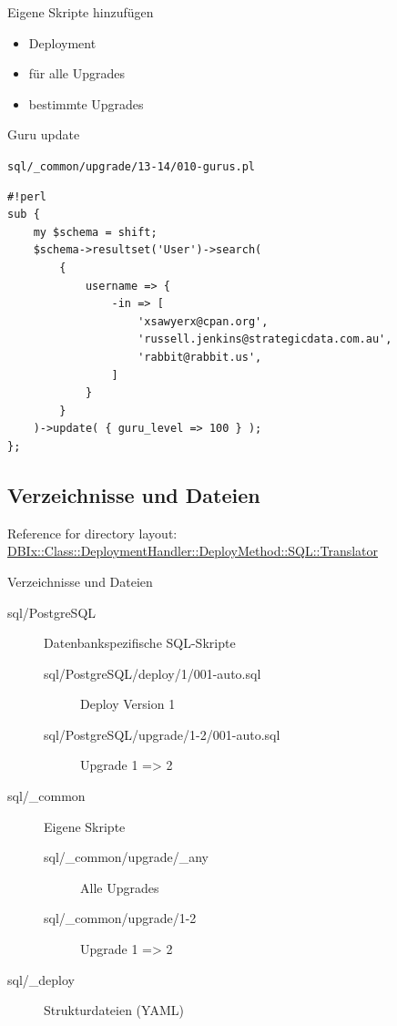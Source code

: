 \begin{frame}{Eigene Skripte hinzufügen}
\begin{itemize}
\item Deployment
\item für alle Upgrades
\item bestimmte Upgrades
\end{itemize}
\end{frame}

\begin{frame}[fragile]{Guru update}

\verb|sql/_common/upgrade/13-14/010-gurus.pl|

\begin{lstlisting}
#!perl
sub {
    my $schema = shift;
    $schema->resultset('User')->search(
        {
            username => {
                -in => [
                    'xsawyerx@cpan.org',
                    'russell.jenkins@strategicdata.com.au',
                    'rabbit@rabbit.us',
                ]
            }
        }
    )->update( { guru_level => 100 } );
};

\end{lstlisting}
\end{frame}

\subsection{Verzeichnisse und Dateien}

Reference for directory layout:
\href{https://metacpan.org/pod/DBIx::Class::DeploymentHandler::DeployMethod::SQL::Translator}{DBIx::Class::DeploymentHandler::DeployMethod::SQL::Translator}

\begin{frame}[fragile]{Verzeichnisse und Dateien}
\begin{description}
\item[sql/PostgreSQL] Datenbankspezifische SQL-Skripte
\begin{description}
\item[sql/PostgreSQL/deploy/1/001-auto.sql] Deploy Version 1
\item[sql/PostgreSQL/upgrade/1-2/001-auto.sql] Upgrade 1 => 2
\end{description}
\item[sql/\_common] Eigene Skripte
\begin{description}
\item[sql/\_common/upgrade/\_any] Alle Upgrades
\item[sql/\_common/upgrade/1-2] Upgrade 1 => 2
\end{description}
\item[sql/\_deploy] Strukturdateien (YAML)
\end{description}
\end{frame}

